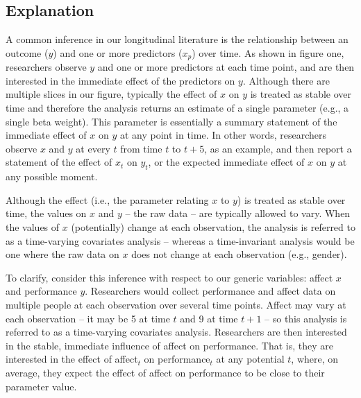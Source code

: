 \documentclass[english,,man]{apa6}
\theoremstyle{definition}
\theoremstyle{definition}
\theoremstyle{definition}
\theoremstyle{remark}
\begin{document}
\hypertarget{explanation}{%
\subsection{Explanation}\label{explanation}}

A common inference in our longitudinal literature is the relationship
between an outcome (\(y\)) and one or more predictors (\(x_{p}\)) over
time. As shown in figure one, researchers observe \(y\) and one or more
predictors at each time point, and are then interested in the immediate
effect of the predictors on \(y\). Although there are multiple slices in
our figure, typically the effect of \(x\) on \(y\) is treated as stable
over time and therefore the analysis returns an estimate of a single
parameter (e.g., a single beta weight). This parameter is essentially a
summary statement of the immediate effect of \(x\) on \(y\) at any point
in time. In other words, researchers observe \(x\) and \(y\) at every
\(t\) from time \(t\) to \(t + 5\), as an example, and then report a
statement of the effect of \(x_{t}\) on \(y_{t}\), or the expected
immediate effect of \(x\) on \(y\) at any possible moment.

Although the effect (i.e., the parameter relating \(x\) to \(y\)) is
treated as stable over time, the values on \(x\) and \(y\) -- the raw
data -- are typically allowed to vary. When the values of \(x\)
(potentially) change at each observation, the analysis is referred to as
a time-varying covariates analysis -- whereas a time-invariant analysis
would be one where the raw data on \(x\) does not change at each
observation (e.g., gender).

To clarify, consider this inference with respect to our generic
variables: affect \(x\) and performance \(y\). Researchers would collect
performance and affect data on multiple people at each observation over
several time points. Affect may vary at each observation -- it may be 5
at time \(t\) and 9 at time \(t + 1\) -- so this analysis is referred to
as a time-varying covariates analysis. Researchers are then interested
in the stable, immediate influence of affect on performance. That is,
they are interested in the effect of affect\(_{t}\) on
performance\(_{t}\) at any potential \(t\), where, on average, they
expect the effect of affect on performance to be close to their
parameter value.
\end{document}

